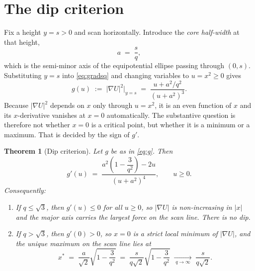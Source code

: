\documentclass[11pt]{article}
\newtheorem{theorem}{Theorem}
\begin{document}
\section{The dip criterion}

Fix a height $y=s>0$ and scan horizontally. Introduce the \emph{core
half-width} at that height,
\begin{equation}
  a\;=\;\frac{s}{q},
\end{equation}
which is the semi-minor axis of the equipotential ellipse passing through
$(0,s)$. Substituting $y=s$ into \eqref{eq:gradsq} and changing variables to
$u=x^{2}\ge 0$ gives
\begin{equation}
  g(u)\;:=\;\bigl|\nabla U\bigr|^{2}\Big|_{y=s}
  \;=\;\frac{u+a^{2}/q^{2}}{(u+a^{2})^{3}} .
  \label{eq:g}
\end{equation}
Because $|\nabla U|^{2}$ depends on $x$ only through $u=x^{2}$, it is an even
function of $x$ and its $x$-derivative vanishes at $x=0$ automatically. The
substantive question is therefore not whether $x=0$ is a critical point, but
whether it is a minimum or a maximum. That is decided by the sign of $g'$.

\begin{theorem}[Dip criterion]
\label{thm:main}
Let $g$ be as in \eqref{eq:g}. Then
\begin{equation}
  g'(u)\;=\;\frac{a^{2}\!\left(1-\dfrac{3}{q^{2}}\right)-2u}
                 {(u+a^{2})^{4}} ,
  \qquad u\ge 0 .
  \label{eq:gprime}
\end{equation}
Consequently:
\begin{enumerate}
  \item If $q\le\sqrt{3}$, then $g'(u)\le 0$ for all $u\ge0$, so $|\nabla U|$
        is non-increasing in $|x|$ and the major axis carries the
        \emph{largest} force on the scan line. There is no dip.
  \item If $q>\sqrt{3}$, then $g'(0)>0$, so $x=0$ is a strict local
        \emph{minimum} of $|\nabla U|$, and the unique maximum on the scan
        line lies at
        \begin{equation}
          x^{*}\;=\;\frac{a}{\sqrt{2}}\sqrt{1-\frac{3}{q^{2}}}
          \;=\;\frac{s}{q\sqrt{2}}\sqrt{1-\frac{3}{q^{2}}}
          \;\xrightarrow[\;q\to\infty\;]{}\;\frac{s}{q\sqrt{2}} .
          \label{eq:xstar}
        \end{equation}
\end{enumerate}
\end{theorem}
\end{document}

